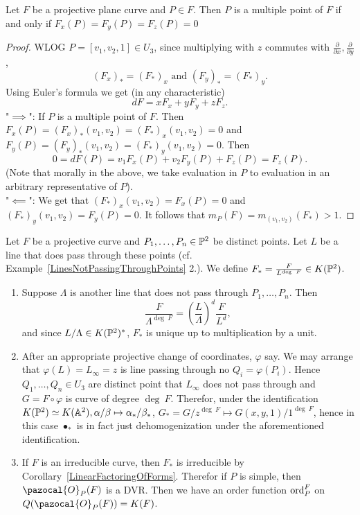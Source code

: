     \begin{lemma}
        Let $F$ be a projective plane curve and $P\in F$. Then $P$ is a multiple point of $F$ if and only if $F_x(P)=F_y(P)=F_z(P)=0$
    \end{lemma}
    \begin{proof}
        WLOG $P=[v_1,v_2,1]\in U_3$, since multiplying with $z$ commutes with $\frac{\partial}{\partial x},\frac{\partial}{\partial y}$, 
        $$(F_x)_\ast = (F_\ast)_x \text{ and } (F_y)_\ast = (F_\ast)_y.$$
        Using Euler's formula we get (in any characteristic) 
        $$dF = xF_x+yF_y+zF_z.$$
        "$\implies$": If $P$ is a multiple point of $F$. Then $F_x(P)=(F_x)_\ast(v_1,v_2)=(F_\ast)_x(v_1,v_2)=0$ and $F_y(P)=(F_y)_\ast(v_1,v_2)=(F_\ast)_y(v_1,v_2)=0$. Then 
        $$0=dF(P)=v_1F_x(P)+v_2F_y(P)+F_z(P) =F_z(P).$$
        (Note that morally in the above, we take evaluation in $P$ to evaluation in an arbitrary representative of $P$).\\
        "$\impliedby$": We get that $(F_\ast)_x(v_1,v_2)=F_x(P)=0$ and $(F_\ast)_y(v_1,v_2)=F_y(P)=0$. It follows that $m_P(F)=m_{(v_1,v_2)}(F_\ast)>1$.        
    \end{proof}
    \begin{definition}
        Let $F$ be a projective curve and $P_1,\dots,P_n\in \mathbb{P}^2$ be distinct points. Let $L$ be a line that does pass through these points (cf. Example~\ref{LinesNotPassingThroughPoints} 2.). We define $F_\ast = \frac{F}{L^{\deg\ F}}\in K(\Pp^2)$.
    \end{definition}
    \begin{remark}
        \begin{enumerate}
            \item Suppose $\Lambda$ is another line that does not pass through $P_1,\dots,P_n$. Then 
            $$\frac{F}{\Lambda^{\deg\ F}}=\left(\frac{L}{\Lambda}\right)^d\frac{F}{L^d},$$
            and since $L/\Lambda \in K(\mathbb{P}^2)^\ast$, $F_\ast$ is unique up to multiplication by a unit. 
            \item After an appropriate projective change of coordinates, $\varphi$ say. We may arrange that $\varphi(L)=L_\infty=z$ is line passing through no $Q_i=\varphi(P_i)$. Hence $Q_1,\dots,Q_n\in U_3$ are distinct point that $L_\infty$ does not pass through and $G=F\circ\varphi$ is curve of degree $\deg \ F$. Therefor, under the identification $K(\mathbb{P}^2)\simeq K(\mathbb{A}^2), \alpha/\beta \mapsto \alpha_\ast/\beta_\ast$, $G_\ast = G/z^{\deg\ F}\mapsto G(x,y,1)/1^{\deg\ F}$, hence in this case $\bullet_\ast$ is in fact just dehomogenization under the aforementioned identification.   
            \item If $F$ is an irreducible curve, then $F_\ast$ is irreducible by Corollary~\ref{LinearFactoringOfForms}. Therefor if $P$ is simple, then $\pazocal{O}_P(F)$ is a DVR. Then we have an order function $\mathrm{ord}_P^F$ on $Q(\pazocal{O}_P(F))=K(F)$. 
        \end{enumerate}
    \end{remark}
